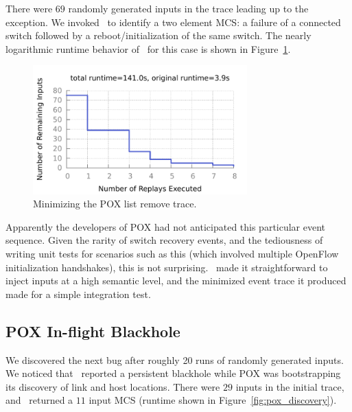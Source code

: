 There were $69$ randomly generated inputs in the trace leading up to the
exception. We invoked \simulator~to identify a two element MCS:
a failure of a connected switch followed by a reboot/initialization of the same switch.
The nearly logarithmic runtime
behavior of \simulator~for this case is shown in Figure~\ref{fig:list_runtime}.

\begin{figure}[t]
    \includegraphics[width=3.25in]{../graphs/runtime/list_remove_error.pdf}
    \caption[]{\label{fig:list_runtime} Minimizing the POX list remove trace.}
\end{figure}

Apparently the developers of POX had not anticipated this particular event
sequence. Given the rarity of switch recovery events, and the tediousness of
writing unit tests for scenarios such as this
(which involved multiple OpenFlow initialization handshakes), this is not
surprising.
\projectname~made it straightforward to inject inputs
at a high semantic level,
and the minimized event
trace it produced made for a simple integration test.


\subsection{POX In-flight Blackhole}
We discovered the next bug after roughly 20 runs of randomly generated inputs.
We noticed that \projectname~reported a persistent blackhole while POX was bootstrapping its
discovery of link and host locations. There were $29$ inputs in the initial trace, and \simulator~returned a $11$ input
MCS (runtime shown in Figure~\ref{fig:pox_discovery}).

